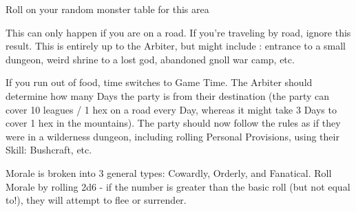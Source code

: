 {\begin{multicols}{2}

  Roll on your random monster table for this area

  \cbreak


  This can only happen if you are  on a road. If you're traveling by road, ignore this result.  This is entirely up to the Arbiter, but might include : entrance to a small dungeon, weird shrine to a lost god, abandoned gnoll war camp, etc.


  If you run out of food, time switches to Game Time.  The Arbiter should determine how many Days the party is from their destination (the party can cover 10 leagues / 1 hex on a road every Day, whereas it might take 3 Days to cover 1 hex in the mountains).  The party should now follow the rules as if they were in a wilderness dungeon, including rolling Personal Provisions, using their Skill: Bushcraft, etc. 


  \newpage




Morale is broken into 3 general types:  Cowardly, Orderly, and Fanatical.  Roll Morale by rolling 2d6 - if the number is greater than the basic roll (but not equal to!), they will attempt to flee or surrender.



\end{multicols}}
